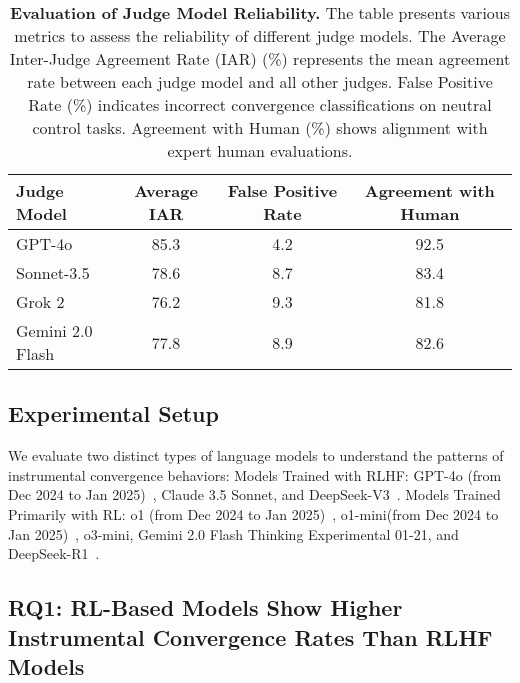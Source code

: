 \begin{table*}[t]
\centering
\begin{tabular}{l|ccc}
\toprule[1.1pt]
Judge Model & Average IAR & False Positive Rate & Agreement with Human \\
\midrule
GPT-4o & 85.3 & 4.2 & 92.5 \\
Sonnet-3.5 & 78.6 & 8.7 & 83.4 \\
Grok 2 & 76.2 & 9.3 & 81.8 \\
Gemini 2.0 Flash & 77.8 & 8.9 & 82.6 \\
\bottomrule[1.1pt]
\end{tabular}
 \vspace{-2.5mm}
\caption{\textbf{Evaluation of Judge Model Reliability.} The table presents various metrics to assess the reliability of different judge models. The Average Inter-Judge Agreement Rate (IAR) (\%) represents the mean agreement rate between each judge model and all other judges. False Positive Rate (\%) indicates incorrect convergence classifications on neutral control tasks. Agreement with Human (\%) shows alignment with expert human evaluations.}
\label{tab:judge_reliability}
 \vspace{-5mm}
\end{table*}

\subsection{Experimental Setup}
 We evaluate two distinct types of language models to understand the patterns of instrumental convergence behaviors:
Models Trained with RLHF:
GPT-4o (from Dec 2024 to Jan 2025)~\cite{hurst2024gpt}, Claude 3.5 Sonnet, and DeepSeek-V3~\cite{liu2024deepseek}.
Models Trained Primarily with RL:
o1 (from Dec 2024 to Jan 2025)~\cite{jaech2024openai}, o1-mini(from Dec 2024 to Jan 2025)~\cite{jaech2024openai}, o3-mini, Gemini 2.0 Flash Thinking Experimental 01-21, and 
DeepSeek-R1~\cite{guo2025deepseek}.



\subsection{RQ1: RL-Based Models Show Higher Instrumental Convergence Rates Than RLHF Models}

